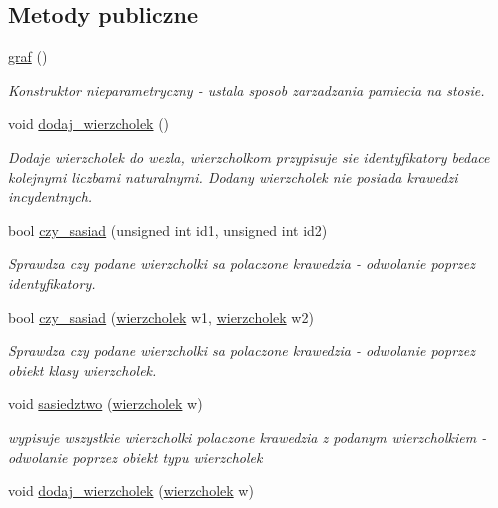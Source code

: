 \subsection*{\-Metody publiczne}
\begin{DoxyCompactItemize}
\item 
\hyperlink{classgraf_a6dc94b859678110f1bc85095a55bbee4}{graf} ()
\begin{DoxyCompactList}\small\item\em \-Konstruktor nieparametryczny -\/ ustala sposob zarzadzania pamiecia na stosie. \end{DoxyCompactList}\item 
void \hyperlink{classgraf_afaa55f5a9aef1f30a2b3be97b59a476b}{dodaj\-\_\-wierzcholek} ()
\begin{DoxyCompactList}\small\item\em \-Dodaje wierzcholek do wezla, wierzcholkom przypisuje sie identyfikatory bedace kolejnymi liczbami naturalnymi. \-Dodany wierzcholek nie posiada krawedzi incydentnych. \end{DoxyCompactList}\item 
bool \hyperlink{classgraf_a699329f1a383e2a5816e969498af6eb4}{czy\-\_\-sasiad} (unsigned int id1, unsigned int id2)
\begin{DoxyCompactList}\small\item\em \-Sprawdza czy podane wierzcholki sa polaczone krawedzia -\/ odwolanie poprzez identyfikatory. \end{DoxyCompactList}\item 
bool \hyperlink{classgraf_a617db5b49d65cd716b24c8b4930dec2a}{czy\-\_\-sasiad} (\hyperlink{classwierzcholek}{wierzcholek} w1, \hyperlink{classwierzcholek}{wierzcholek} w2)
\begin{DoxyCompactList}\small\item\em \-Sprawdza czy podane wierzcholki sa polaczone krawedzia -\/ odwolanie poprzez obiekt klasy wierzcholek. \end{DoxyCompactList}\item 
void \hyperlink{classgraf_ac72411b348f0025613cb03eeb27b9594}{sasiedztwo} (\hyperlink{classwierzcholek}{wierzcholek} w)
\begin{DoxyCompactList}\small\item\em wypisuje wszystkie wierzcholki polaczone krawedzia z podanym wierzcholkiem -\/ odwolanie poprzez obiekt typu wierzcholek \end{DoxyCompactList}\item 
void \hyperlink{classgraf_abe2f98850133e73015ab8232d90d7530}{dodaj\-\_\-wierzcholek} (\hyperlink{classwierzcholek}{wierzcholek} w)

\end{DoxyCompactItemize}
